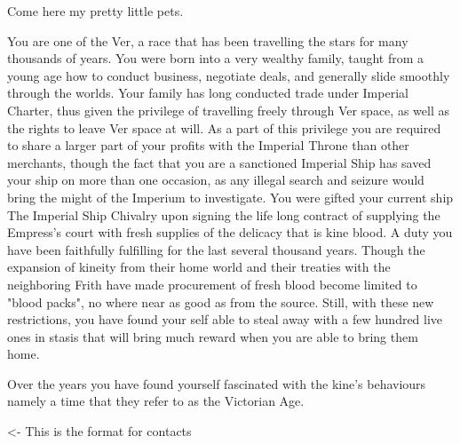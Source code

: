 \documentclass[char]{guildcamp4}
\begin{document}
\name{\cVone{}}


Come here my pretty little pets.

You are one of the Ver, a race that has been travelling the stars for many thousands of years. You were born into a very 
wealthy family, taught from a young age how to conduct business, negotiate deals, and generally slide smoothly through the
worlds. Your family has long conducted trade under Imperial Charter, thus given the privilege of travelling freely through
Ver space, as well as the rights to leave Ver space at will. As a part of this privilege you are required to share a larger 
part of your profits with the Imperial Throne than other merchants, though the fact that you are a sanctioned Imperial Ship 
has saved your ship on more than one occasion, as any illegal search and seizure would bring the might of the Imperium to 
investigate. You were gifted your current ship The Imperial Ship Chivalry upon signing the life long contract of supplying 
the Empress's court with fresh supplies of the delicacy that is kine blood. A duty you have been faithfully fulfilling for
the last several thousand years. Though the expansion of kineity from their home world and their treaties with the neighboring
Frith have made procurement of fresh blood become limited to "blood packs", no where near as good as from the source.
Still, with these new restrictions, you have found your self able to steal away with a few hundred live ones in stasis 
that will bring much reward when you are able to bring them home. 

Over the years you have found yourself fascinated with the kine's behaviours namely a time that they refer to as the 
Victorian Age. 

\begin{itemz}[Goals]
	\item 
\end{itemz}

\begin{itemz}[Notes]
	\item 
\end{itemz}

\begin{contacts}
	\contact{\cVtwo{}} <- This is the format for contacts 
\end{contacts}
\end{document}

